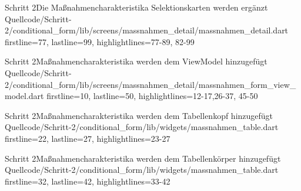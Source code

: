 \begin{alexlisting}{Schritt 2}{Die Maßnahmencharakteristika Selektionskarten werden ergänzt}
  {Quellcode/Schritt-2/conditional_form/lib/screens/massnahmen_detail/massnahmen_detail.dart}
  {firstline=77, lastline=99, highlightlines={77-89, 82-99}}
  \label{lst:Schritt2MassnahmencharakteristikaSelektionskartenWerdenErgaenzt}
\end{alexlisting}




\begin{alexlisting}{Schritt 2}{Maßnahmencharakteristika werden dem ViewModel hinzugefügt}
  {Quellcode/Schritt-2/conditional_form/lib/screens/massnahmen_detail/massnahmen_form_view_model.dart}
  {firstline=10, lastline=50, highlightlines={12-17,26-37, 45-50}}
  \label{lst:Schritt2MassnahmencharakteristikaWerdenDemViewModelHinzugefuegt}
\end{alexlisting}

\begin{alexlisting}{Schritt 2}{Maßnahmencharakteristika werden dem Tabellenkopf hinzugefügt}
  {Quellcode/Schritt-2/conditional_form/lib/widgets/massnahmen_table.dart}
  {firstline=22, lastline=27, highlightlines={23-27}}
  \label{lst:Schritt2MassnahmencharakteristikaEerdenDemTabellenkopfHinzugefuegt}
\end{alexlisting}


\begin{alexlisting}{Schritt 2}{Maßnahmencharakteristika werden dem Tabellenkörper hinzugefügt}
  {Quellcode/Schritt-2/conditional_form/lib/widgets/massnahmen_table.dart}
  {firstline=32, lastline=42, highlightlines={33-42}}
  \label{lst:Schritt2MassnahmencharakteristikaWerdenDemTabellenkoerperHinzugefuegt}
\end{alexlisting}


\clearpage 
